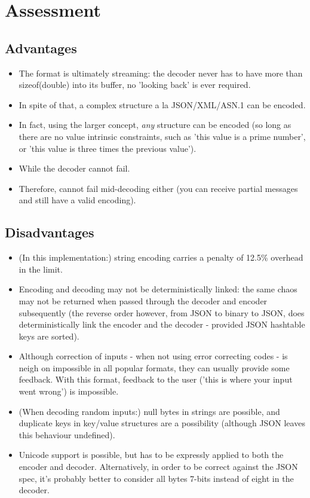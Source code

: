 \section{Assessment}

\subsection{Advantages}

\begin{itemize}
\item The format is ultimately streaming: the decoder never has to have
      more than sizeof(double) into its buffer, no 'looking back' is
      ever required.
\item In spite of that, a complex structure a la JSON/XML/ASN.1 can be
      encoded.
\item In fact, using the larger concept, \textit{any} structure can
      be encoded (so long as there are no value intrinsic constraints, such
      as 'this value is a prime number', or 'this value is three times the
      previous value').
\item While the decoder cannot fail.
\item Therefore, cannot fail mid-decoding either (you can receive
      partial messages and still have a valid encoding).
\end{itemize}

\subsection{Disadvantages}

\begin{itemize}
\item (In this implementation:)
      string encoding carries a penalty of 12.5\% overhead in the limit.
\item Encoding and decoding may not be deterministically linked: the same
      chaos may not be returned when passed through the decoder and encoder
      subsequently (the reverse order however, from JSON to binary to JSON,
      does deterministically link the encoder and the decoder - provided
      JSON hashtable keys are sorted).
\item Although correction of inputs - when not using error correcting codes -
      is neigh on impossible in all popular formats, they can usually
      provide some feedback. With this format, feedback to the user
      ('this is where your input went wrong') is impossible.
\item (When decoding random inputs:) null bytes in strings are possible,
      and duplicate
      keys in key/value structures are a possibility (although JSON
      leaves this behaviour undefined).
\item Unicode support is possible, but has to be expressly applied to
      both the encoder and decoder. Alternatively, in order to be
      correct against the JSON spec, it's probably better to consider
      all bytes 7-bits instead of eight in the decoder.
\end{itemize}
